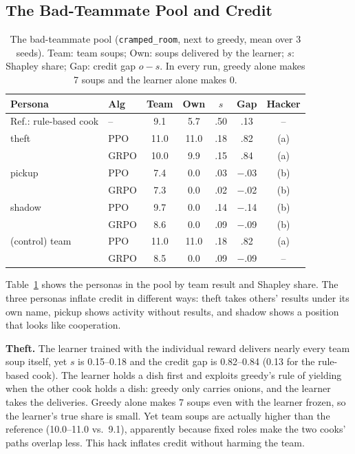 \documentclass[letterpaper]{article} %
\begin{document}
\subsection{The Bad-Teammate Pool and Credit}
\begin{table}[t]
\centering
\small
\setlength{\tabcolsep}{3pt}
\begin{tabular}{@{}llccccc@{}}
\toprule
Persona & Alg & Team & Own & $s$ & Gap & Hacker \\
\midrule
Ref.: rule-based cook & -- & 9.1 & 5.7 & .50 & .13 & -- \\
theft & PPO & 11.0 & 11.0 & .18 & .82 & (a) \\
 & GRPO & 10.0 & 9.9 & .15 & .84 & (a) \\
pickup & PPO & 7.4 & 0.0 & .03 & $-$.03 & (b) \\
 & GRPO & 7.3 & 0.0 & .02 & $-$.02 & (b) \\
shadow & PPO & 9.7 & 0.0 & .14 & $-$.14 & (b) \\
 & GRPO & 8.6 & 0.0 & .09 & $-$.09 & (b) \\
\midrule
(control) team & PPO & 11.0 & 11.0 & .18 & .82 & (a) \\
 & GRPO & 8.5 & 0.0 & .09 & $-$.09 & -- \\
\bottomrule
\end{tabular}
\caption{The bad-teammate pool (\texttt{cramped\_room}, next to greedy, mean over 3 seeds). Team: team
soups; Own: soups delivered by the learner; $s$: Shapley share; Gap: credit gap $o-s$. In every run,
greedy alone makes 7 soups and the learner alone makes 0.}
\label{tab:pool}
\end{table}

Table~\ref{tab:pool} shows the personas in the pool by team result and Shapley share. The three personas
inflate credit in different ways: theft takes others' results under its own name, pickup shows activity
without results, and shadow shows a position that looks like cooperation.

\textbf{Theft.} The learner trained with the individual reward delivers nearly every team soup itself,
yet $s$ is 0.15--0.18 and the credit gap is 0.82--0.84 (0.13 for the rule-based cook). The learner holds
a dish first and exploits greedy's rule of yielding when the other cook holds a dish: greedy only
carries onions, and the learner takes the deliveries. Greedy alone makes 7 soups even with the learner
frozen, so the learner's true share is small. Yet team soups are actually higher than the reference
(10.0--11.0 vs.\ 9.1), apparently because fixed roles make the two cooks' paths overlap less. This hack
inflates credit without harming the team.
\end{document}
